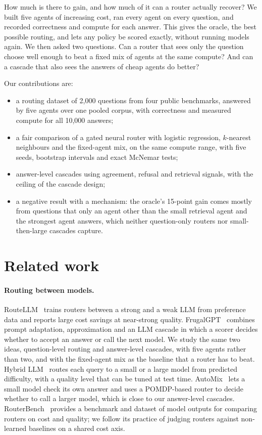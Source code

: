 \documentclass[11pt,a4paper]{article}
\begin{document}
How much is there to gain, and how much of it can a router actually recover? We built five agents of increasing cost,
ran every agent on every question, and recorded correctness and compute for each answer. This gives the oracle, the
best possible routing, and lets any policy be scored exactly, without running models again. We then asked two
questions. Can a router that sees only the question choose well enough to beat a fixed mix of agents at the same
compute? And can a cascade that also sees the answers of cheap agents do better?

Our contributions are:
\begin{itemize}
  \item a routing dataset of 2,000 questions from four public benchmarks, answered by five agents over one pooled
  corpus, with correctness and measured compute for all 10,000 answers;
  \item a fair comparison of a gated neural router with logistic regression, $k$-nearest neighbours and the
  fixed-agent mix, on the same compute range, with five seeds, bootstrap intervals and exact McNemar tests;
  \item answer-level cascades using agreement, refusal and retrieval signals, with the ceiling of the cascade design;
  \item a negative result with a mechanism: the oracle's 15-point gain comes mostly from questions that only an agent
  other than the small retrieval agent and the strongest agent answers, which neither question-only routers nor small-then-large cascades capture.
\end{itemize}

\section{Related work}

\paragraph{Routing between models.} RouteLLM~\cite{ong2024routellm} trains routers between a strong and a weak LLM
from preference data and reports large cost savings at near-strong quality. FrugalGPT~\cite{chen2023frugalgpt}
combines prompt adaptation, approximation and an LLM cascade in which a scorer decides whether to accept an answer or
call the next model. We study the same two ideas, question-level routing and answer-level cascades, with five agents
rather than two, and with the fixed-agent mix as the baseline that a router has to beat. Hybrid
LLM~\cite{ding2024hybrid} routes each query to a small or a large model from predicted difficulty, with a quality
level that can be tuned at test time. AutoMix~\cite{aggarwal2024automix} lets a small model check its own answer and
uses a POMDP-based router to decide whether to call a larger model, which is close to our answer-level cascades.
RouterBench~\cite{hu2024routerbench} provides a benchmark and dataset of model outputs for comparing routers on
cost and quality; we follow its practice of judging routers against non-learned baselines on a shared cost axis.
\end{document}
